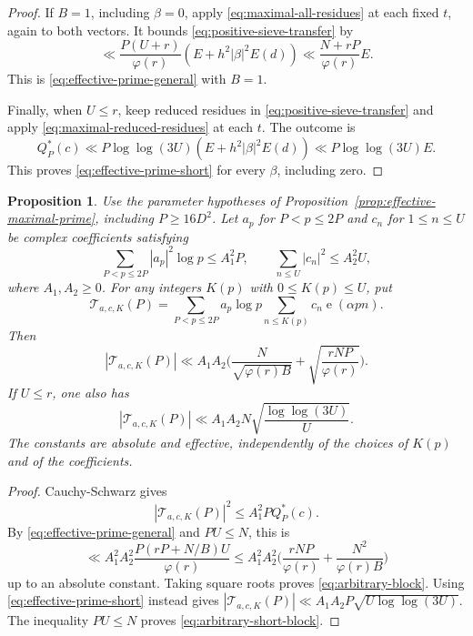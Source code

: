 \documentclass[11pt]{amsart}
\numberwithin{equation}{section}
\numberwithin{figure}{section}
\newtheorem{proposition}{Proposition}[section]
\theoremstyle{definition}
\newcommand{\e}{\operatorname{e}}
\begin{document}
\begin{proof}
If $B=1$, including $\beta=0$, apply
\eqref{eq:maximal-all-residues} at each fixed $t$, again to both vectors.
It bounds \eqref{eq:positive-sieve-transfer} by
\[
 \ll\frac{P(U+r)}{\varphi(r)}
                  (E+h^2|\beta|^2E(d))
 \ll\frac{N+rP}{\varphi(r)}E.
\]
This is \eqref{eq:effective-prime-general} with $B=1$.

Finally, when $U\le r$, keep reduced residues in
\eqref{eq:positive-sieve-transfer} and apply
\eqref{eq:maximal-reduced-residues} at each $t$.
The outcome is
\[
 Q_P^*(c)\ll P\log\log(3U)
                  (E+h^2|\beta|^2E(d))
 \ll P\log\log(3U)E.
\]
This proves \eqref{eq:effective-prime-short} for every $\beta$, including zero.
\end{proof}

\begin{proposition}\label{prop:arbitrary-prefixes}
Use the parameter hypotheses of Proposition~\ref{prop:effective-maximal-prime},
including $P\ge16D^2$. Let $a_p$ for $P<p\le2P$ and $c_n$ for
$1\le n\le U$ be complex coefficients satisfying
\[
 \sum_{P<p\le2P}|a_p|^2\log p\le A_1^2P,\qquad
 \sum_{n\le U}|c_n|^2\le A_2^2U,
\]
where $A_1,A_2\ge0$. For any integers $K(p)$ with $0\le K(p)\le U$, put
\[
 \mathcal T_{a,c,K}(P)=
 \sum_{P<p\le2P}a_p\log p\sum_{n\le K(p)}c_n\e(\alpha pn).
\]
Then
\begin{equation}\label{eq:arbitrary-block}
 |\mathcal T_{a,c,K}(P)|\ll A_1A_2
 \bigg(\frac{N}{\sqrt{\varphi(r)B}}
 +\sqrt{\frac{rNP}{\varphi(r)}}\bigg).
\end{equation}
If $U\le r$, one also has
\begin{equation}\label{eq:arbitrary-short-block}
 |\mathcal T_{a,c,K}(P)|
 \ll A_1A_2N\sqrt{\frac{\log\log(3U)}U}.
\end{equation}
The constants are absolute and effective, independently of the choices
of $K(p)$ and of the coefficients.
\end{proposition}

\begin{proof}
Cauchy-Schwarz gives
\[
 |\mathcal T_{a,c,K}(P)|^2\le A_1^2P Q_P^*(c).
\]
By \eqref{eq:effective-prime-general} and $PU\le N$, this is
\[
 \ll A_1^2A_2^2\frac{P(rP+N/B)U}{\varphi(r)}
 \le A_1^2A_2^2
       \Big(\frac{rNP}{\varphi(r)}+\frac{N^2}{\varphi(r)B}\Big)
\]
up to an absolute constant. Taking square roots proves
\eqref{eq:arbitrary-block}.
Using \eqref{eq:effective-prime-short} instead gives
$|\mathcal T_{a,c,K}(P)|\ll A_1A_2P\sqrt{U\log\log(3U)}$.
The inequality $PU\le N$ proves \eqref{eq:arbitrary-short-block}.
\end{proof}
\end{document}
